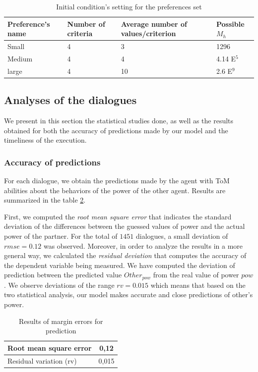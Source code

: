 \documentclass[conference, letterpaper]{IEEEtran}
\begin{document}
	
	\begin{table}[]
		\caption{Initial condition's setting for the preferences set} 
		\centering
		\begin{tabular}{|p{1.75cm}|p{1.5cm}|p{1.75cm}|p{1.5cm}|}
			\hline 
			\textbf{Preference's name } & Number of criteria & Average number of values/criterion & Possible $M_h$\\
			\hline
			Small & 4 & 3 & 1296 \\
			\hline
			Medium & 4 & 4 & 4.14 E$^5$ \\
			\hline
			large & 4 & 10 & 2.6 E$^9$ \\
			\hline
		\end{tabular}
		
		\label{tab:initP}
	\end{table}
	
	\subsection{Analyses of the dialogues}
	We present in this section the statistical studies done, as well as the results obtained for both the accuracy of predictions made by our model and the timeliness of the execution.
	
	\subsubsection{Accuracy of predictions} For each dialogue, we obtain the predictions made by the agent with ToM abilities about the behaviors of the power of the other agent. Results are summarized in the table \ref{tab:res1}. 
	
	First, we computed the \emph{root mean square error} that indicates the standard deviation of the differences between the guessed  values of power and the actual power of the partner. For the total of $1451$ dialogues, a small deviation of $rmse= 0.12$ was observed. Moreover, in order to analyze the results in a more general way, we calculated the \emph{residual deviation}  that computes the accuracy of the dependent variable being measured. We have computed the deviation of prediction between the predicted value  $Other_{pow}$ from the real value of power $pow$. 
	We observe deviations of the range $rv = 0.015$ which means that based on the two statistical analysis, our model makes accurate and close predictions of other's power.
	
	
	\begin{table}[h]
		\centering
		\large
		\caption{Results of margin errors for prediction} 
		\begin{tabular}{|l|c|}
			\hline
			Root mean square error & 0,12 \\
			\hline
			Residual variation (rv) & 0,015 \\
			\hline
		\end{tabular}
		
		\label{tab:res1}
	\end{table}
	
\end{document}

